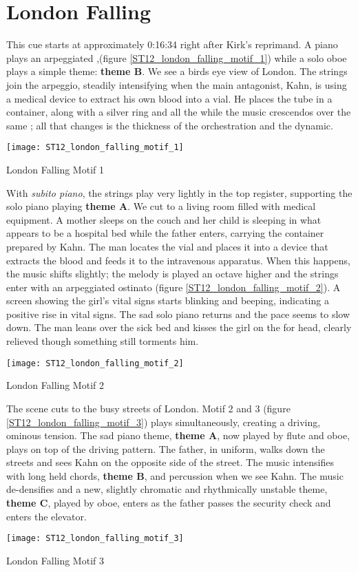 
\section{London Falling}
This cue starts at approximately 0:16:34 right after Kirk's reprimand. A piano plays an arpeggiated \bflatm,(figure \ref{ST12_london_falling_motif_1}) while a solo oboe plays a simple theme: \textbf{theme B}. We see a birds eye view of London. The strings join the arpeggio, steadily intensifying when the main antagonist, Kahn, is using a medical device to extract his own blood into a vial. He places the tube in a container, along with a silver ring and all the while the music crescendos over the same \bflatm; all that changes is the thickness of the orchestration and the dynamic. 
\begin{marginfigure}
\texttt{[image: ST12\_london\_falling\_motif\_1]}
	\caption{London Falling Motif 1}
	\label{ST12_london_falling_motif_1}
\end{marginfigure}

With \textit{subito piano}, the strings play very lightly in the top register, supporting the solo piano playing \textbf{theme A}. We cut to a living room filled with medical equipment. A mother sleeps on the couch and her child is sleeping in what appears to be a hospital bed while the father enters, carrying the container prepared by Kahn. The man locates the vial and places it into a device that extracts the blood and feeds it to the intravenous apparatus. When this happens, the music shifts slightly; the melody is played an octave higher and the strings enter with an arpeggiated ostinato (figure \ref{ST12_london_falling_motif_2}). A screen showing the girl's vital signs starts blinking and beeping, indicating a positive rise in vital signs. The sad solo piano returns and the pace seems to slow down. The man leans over the sick bed and kisses the girl on the for head, clearly relieved though something still torments him. 
\begin{marginfigure}
\texttt{[image: ST12\_london\_falling\_motif\_2]}
	\caption{London Falling Motif 2}
	\label{ST12_london_falling_motif_2}
\end{marginfigure}

The scene cuts to the busy streets of London. Motif 2 and 3 (figure \ref{ST12_london_falling_motif_3}) plays simultaneously, creating a driving, ominous tension. The sad piano theme, \textbf{theme A}, now played by flute and oboe, plays on top of the driving pattern. The father, in uniform, walks down the streets and sees Kahn on the opposite side of the street. The music intensifies with long held chords, \textbf{theme B}, and percussion when we see Kahn. The music de-densifies and a new, slightly chromatic and rhythmically unstable theme, \textbf{theme C}, played by oboe, enters as the father passes the security check and enters the elevator.
\begin{marginfigure}
\texttt{[image: ST12\_london\_falling\_motif\_3]}
	\caption{London Falling Motif 3}
	\label{ST12_london_falling_motif_3}
\end{marginfigure}

